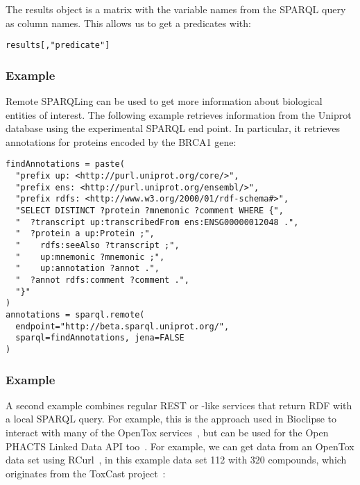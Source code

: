 \documentclass[12pt]{article}
\begin{document}
The results object is a matrix with the variable names from the SPARQL query as column names.
This allows us to get a predicates with:

\begin{footnotesize}
\begin{verbatim}
results[,"predicate"]
\end{verbatim}
\end{footnotesize}

\subsubsection{Example}

Remote SPARQLing can be used to get more information about biological entities of interest. The following
example retrieves information from the Uniprot database using the experimental SPARQL end point. In
particular, it retrieves annotations for proteins encoded by the BRCA1 gene:

\begin{footnotesize}
\begin{verbatim}
findAnnotations = paste(
  "prefix up: <http://purl.uniprot.org/core/>",
  "prefix ens: <http://purl.uniprot.org/ensembl/>",
  "prefix rdfs: <http://www.w3.org/2000/01/rdf-schema#>",
  "SELECT DISTINCT ?protein ?mnemonic ?comment WHERE {",
  "  ?transcript up:transcribedFrom ens:ENSG00000012048 .",
  "  ?protein a up:Protein ;",
  "    rdfs:seeAlso ?transcript ;",
  "    up:mnemonic ?mnemonic ;",
  "    up:annotation ?annot .",
  "  ?annot rdfs:comment ?comment .",
  "}"
)
annotations = sparql.remote(
  endpoint="http://beta.sparql.uniprot.org/",
  sparql=findAnnotations, jena=FALSE
)
\end{verbatim}
\end{footnotesize}

\subsubsection{Example}

A second example combines regular REST or -like services that return RDF with a local SPARQL query.
For example, this is the approach used in Bioclipse to interact with many of the OpenTox
services~\cite{Willighagen2013}, but can be used for the Open PHACTS Linked Data API
too~\cite{Williams2012}. For example, we can get data from an OpenTox data set using
RCurl~\cite{Hardy2010,Lang2013}, in this example data set 112 with 320 compounds,
which originates from the ToxCast project~\cite{Dix2007}:
\end{document}
